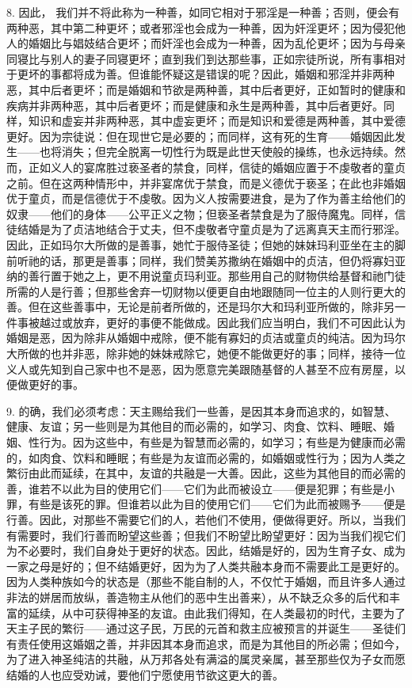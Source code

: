 8. 因此， 我们并不将此称为一种善，如同它相对于邪淫是一种善；否则，便会有两种恶，其中第二种更坏；或者邪淫也会成为一种善，因为奸淫更坏；因为侵犯他人的婚姻比与娼妓结合更坏；而奸淫也会成为一种善，因为乱伦更坏；因为与母亲同寝比与别人的妻子同寝更坏；直到我们到达那些事，正如宗徒所说，所有事相对于更坏的事都将成为善。但谁能怀疑这是错误的呢？因此，婚姻和邪淫并非两种恶，其中后者更坏；而是婚姻和节欲是两种善，其中后者更好，正如暂时的健康和疾病并非两种恶，其中后者更坏；而是健康和永生是两种善，其中后者更好。同样，知识和虚妄并非两种恶，其中虚妄更坏；而是知识和爱德是两种善，其中爱德更好。因为宗徒说：但在现世它是必要的；而同样，这有死的生育——婚姻因此发生——也将消失；但完全脱离一切性行为既是此世天使般的操练，也永远持续。然而，正如义人的宴席胜过亵圣者的禁食，同样，信徒的婚姻应置于不虔敬者的童贞之前。但在这两种情形中，并非宴席优于禁食，而是义德优于亵圣；在此也非婚姻优于童贞，而是信德优于不虔敬。因为义人按需要进食，是为了作为善主给他们的奴隶——他们的身体——公平正义之物；但亵圣者禁食是为了服侍魔鬼。同样，信徒结婚是为了贞洁地结合于丈夫，但不虔敬者守童贞是为了远离真天主而行邪淫。因此，正如玛尔大所做的是善事，她忙于服侍圣徒；但她的妹妹玛利亚坐在主的脚前听祂的话，那更是善事；同样，我们赞美苏撒纳在婚姻中的贞洁，但仍将寡妇亚纳的善行置于她之上，更不用说童贞玛利亚。那些用自己的财物供给基督和祂门徒所需的人是行善；但那些舍弃一切财物以便更自由地跟随同一位主的人则行更大的善。但在这些善事中，无论是前者所做的，还是玛尔大和玛利亚所做的，除非另一件事被越过或放弃，更好的事便不能做成。因此我们应当明白，我们不可因此认为婚姻是恶，因为除非从婚姻中戒除，便不能有寡妇的贞洁或童贞的纯洁。因为玛尔大所做的也并非恶，除非她的妹妹戒除它，她便不能做更好的事；同样，接待一位义人或先知到自己家中也不是恶，因为愿意完美跟随基督的人甚至不应有房屋，以便做更好的事。\par

9. 的确，我们必须考虑：天主赐给我们一些善，是因其本身而追求的，如智慧、健康、友谊；另一些则是为其他目的而必需的，如学习、肉食、饮料、睡眠、婚姻、性行为。因为这些中，有些是为智慧而必需的，如学习；有些是为健康而必需的，如肉食、饮料和睡眠；有些是为友谊而必需的，如婚姻或性行为；因为人类之繁衍由此而延续，在其中，友谊的共融是一大善。因此，这些为其他目的而必需的善，谁若不以此为目的使用它们——它们为此而被设立——便是犯罪；有些是小罪，有些是该死的罪。但谁若以此为目的使用它们——它们为此而被赐予——便是行善。因此，对那些不需要它们的人，若他们不使用，便做得更好。所以，当我们有需要时，我们行善而盼望这些善；但我们不盼望比盼望更好：因为当我们视它们为不必要时，我们自身处于更好的状态。因此，结婚是好的，因为生育子女、成为一家之母是好的；但不结婚更好，因为为了人类共融本身而不需要此工是更好的。因为人类种族如今的状态是（那些不能自制的人，不仅忙于婚姻，而且许多人通过非法的姘居而放纵，善造物主从他们的恶中生出善来），从不缺乏众多的后代和丰富的延续，从中可获得神圣的友谊。由此我们得知，在人类最初的时代，主要为了天主子民的繁衍——通过这子民，万民的元首和救主应被预言的并诞生——圣徒们有责任使用这婚姻之善，并非因其本身而追求，而是为其他目的所必需；但如今，为了进入神圣纯洁的共融，从万邦各处有满溢的属灵亲属，甚至那些仅为子女而愿结婚的人也应受劝诫，要他们宁愿使用节欲这更大的善。\par

